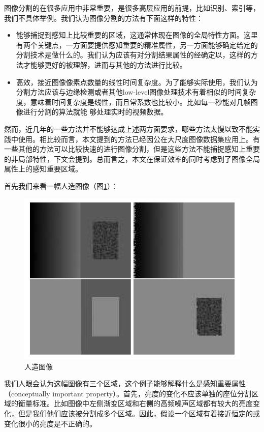 图像分割的在很多应用中非常重要，是很多高层应用的前提，比如识别、索引等，我们不具体举例。我们认为图像分割的方法有下面这样的特性：
\begin{itemize}
\item 能够捕捉到感知上比较重要的区域，这通常体现在图像的全局特性方面。这里有两个关键点，一方面要提供感知重要的精准属性，另一方面能够确定给定的分割技术是做什么的。我们认为应该有对分割结果属性的经确定以，这样的方法才能够更好的被理解，进而与其他的方法进行比较。
\item 高效，接近图像像素点数量的线性时间复杂度。为了能够实际使用，我们认为分割方法应该与边缘检测或者其他low-level图像处理技术有着相似的时间复杂度，意味着时间复杂度是线性，而且常系数也比较小。比如每一秒能对几帧图像进行分割的算法就能
够处理实时的视频数据。
\end{itemize}

然而，近几年的一些方法并不能够达成上述两方面要求，哪些方法太慢以致不能实践中使用。相比较而言，本文提到的方法已经因公在大尺度图像数据集应用上。有一些其他的方法可以比较快速的进行图像分割，但是这些方法不能捕捉感知上重要的非局部特性，下文会提到。总而言之，本文在保证效率的同时考虑到了图像全局属性上的感知重要区域。

首先我们来看一幅人造图像（图\ref{fig:man_made}）：
\begin{figure}
\centering\includegraphics[width=15cm]{imgs/ch2/man_made}
\caption{人造图像}
\label{fig:man_made}
\end{figure}

我们人眼会认为这幅图像有三个区域，这个例子能够解释什么是感知重要属性（conceptually important property）。首先，亮度的变化不应该单独的座位分割区域的衡量标准。比如图像中左侧渐变区域和右侧的高频噪声区域都有较大的亮度变化，但是我们他们应该被分割成多个区域。因此，假设一个区域有着接近恒定的或变化很小的亮度是不正确的。

